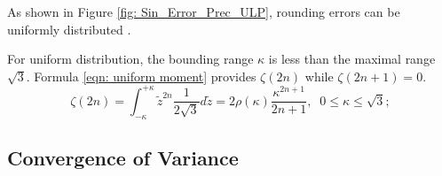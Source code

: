 \documentclass[twoside]{article}
\numberwithin{equation}{section}
\begin{document}

As shown in Figure \ref{fig: Sin_Error_Prec_ULP}, rounding errors can be uniformly distributed \cite{Prev_Precision_Arithmetic}.

For uniform distribution, the bounding range $\kappa$ is less than the maximal range $\sqrt{3}$.
Formula \eqref{eqn: uniform moment} provides $\zeta(2n)$ while $\zeta(2n + 1) = 0$.
\begin{equation}
\label{eqn: uniform moment}
\zeta(2n) = \int_{-\kappa}^{+\kappa} \tilde{z}^{2n} \frac{1}{2 \sqrt{3}} d \tilde{z} = 2 \rho(\kappa) \frac{\kappa^{2n+1}}{2n + 1}, \;\; 0 \leq \kappa \leq \sqrt{3}; 
\end{equation}









\subsection{Convergence of Variance}

\iffalse
\end{document}
